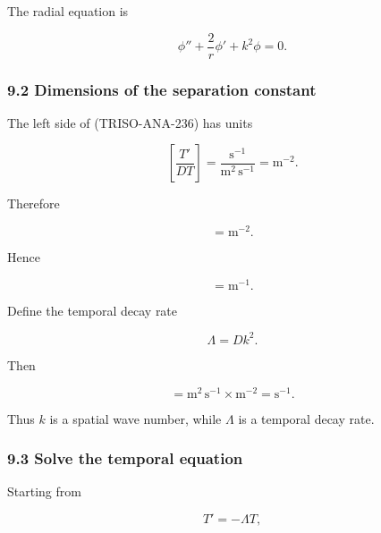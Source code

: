 \documentclass[11pt,a4paper]{article}
\begin{document}
The radial equation is

\begin{equation}
\boxed{
\phi''
+
\frac2r\phi'
+
k^2\phi
=
0.
}
\tag{TRISO-ANA-238}
\label{eq:triso-ana-238}
\end{equation}

\subsubsection*{9.2 Dimensions of the separation constant}

The left side of (TRISO-ANA-236) has units

\begin{equation}
\left[
\frac{T'}{DT}
\right]
=
\frac{\mathrm{s^{-1}}}{\mathrm{m^2\,s^{-1}}}
=
\mathrm{m^{-2}}.
\tag{TRISO-ANA-239}
\label{eq:triso-ana-239}
\end{equation}

Therefore

\begin{equation}
[k^2]=\mathrm{m^{-2}}.
\tag{TRISO-ANA-240}
\label{eq:triso-ana-240}
\end{equation}

Hence

\begin{equation}
[k]=\mathrm{m^{-1}}.
\tag{TRISO-ANA-241}
\label{eq:triso-ana-241}
\end{equation}

Define the temporal decay rate

\begin{equation}
\boxed{
\Lambda=Dk^2.
}
\tag{TRISO-ANA-242}
\label{eq:triso-ana-242}
\end{equation}

Then

\begin{equation}
[\Lambda]
=
\mathrm{m^2\,s^{-1}}
\times
\mathrm{m^{-2}}
=
\mathrm{s^{-1}}.
\tag{TRISO-ANA-243}
\label{eq:triso-ana-243}
\end{equation}

Thus $k$ is a spatial wave number, while $\Lambda$ is a temporal decay rate.

\subsubsection*{9.3 Solve the temporal equation}

Starting from

\begin{equation}
T'=-\Lambda T,
\tag{TRISO-ANA-244}
\label{eq:triso-ana-244}
\end{equation}
\end{document}
